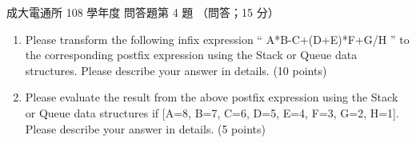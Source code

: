 \begin{pastexam}[label={px:ncku-108-comm-ds-07}]{成大電通所 108 學年度 問答題第 4 題}
（問答；15 分）

\begin{enumerate}[label=(\Alph*)]
\item Please transform the following infix expression `` A*B-C+(D+E)*F+G/H '' to the corresponding
postfix expression using the Stack or Queue data structures. Please describe your answer in details. (10
points)
\item Please evaluate the result from the above postfix expression using the Stack or Queue data
structures if [A=8, B=7, C=6, D=5, E=4, F=3, G=2, H=1]. Please describe your answer in details. (5
points)
\end{enumerate}
\end{pastexam}

